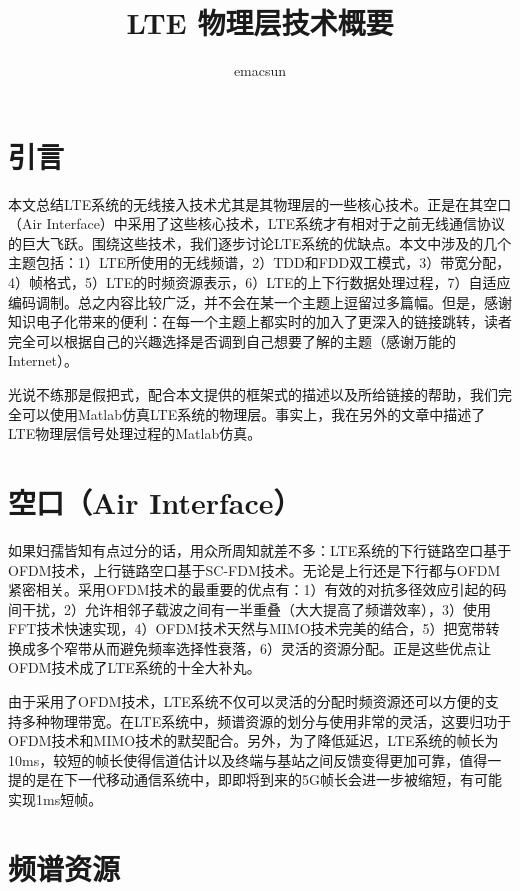 \documentclass[10pt,a4paper,UTF8]{article}
\author{emacsun}
\date{}
\title{LTE 物理层技术概要}
\begin{document}
\maketitle\xiaosihao
\tableofcontents\newpage\newpage


\section{引言}
\label{sec:orgheadline1}



本文总结LTE系统的无线接入技术尤其是其物理层的一些核心技术。正是在其空口（Air Interface）中采用了这些核心技术，LTE系统才有相对于之前无线通信协议的巨大飞跃。围绕这些技术，我们逐步讨论LTE系统的优缺点。本文中涉及的几个主题包括：1）LTE所使用的无线频谱，2）TDD和FDD双工模式，3）带宽分配，4）帧格式，5）LTE的时频资源表示，6）LTE的上下行数据处理过程，7）自适应编码调制。总之内容比较广泛，并不会在某一个主题上逗留过多篇幅。但是，感谢知识电子化带来的便利：在每一个主题上都实时的加入了更深入的链接跳转，读者完全可以根据自己的兴趣选择是否调到自己想要了解的主题（感谢万能的Internet）。

光说不练那是假把式，配合本文提供的框架式的描述以及所给链接的帮助，我们完全可以使用Matlab仿真LTE系统的物理层。事实上，我在另外的文章中描述了LTE物理层信号处理过程的Matlab仿真。

\section{空口（Air Interface）}
\label{sec:orgheadline2}


如果妇孺皆知有点过分的话，用众所周知就差不多：LTE系统的下行链路空口基于OFDM技术，上行链路空口基于SC-FDM技术。无论是上行还是下行都与OFDM紧密相关。采用OFDM技术的最重要的优点有：1）有效的对抗多径效应引起的码间干扰，2）允许相邻子载波之间有一半重叠（大大提高了频谱效率），3）使用FFT技术快速实现，4）OFDM技术天然与MIMO技术完美的结合，5）把宽带转换成多个窄带从而避免频率选择性衰落，6）灵活的资源分配。正是这些优点让OFDM技术成了LTE系统的十全大补丸。

由于采用了OFDM技术，LTE系统不仅可以灵活的分配时频资源还可以方便的支持多种物理带宽。在LTE系统中，频谱资源的划分与使用非常的灵活，这要归功于OFDM技术和MIMO技术的默契配合。另外，为了降低延迟，LTE系统的帧长为10ms，较短的帧长使得信道估计以及终端与基站之间反馈变得更加可靠，值得一提的是在下一代移动通信系统中，即即将到来的5G帧长会进一步被缩短，有可能实现1ms短帧。

\section{频谱资源}
\label{sec:orgheadline3}
\end{document}
